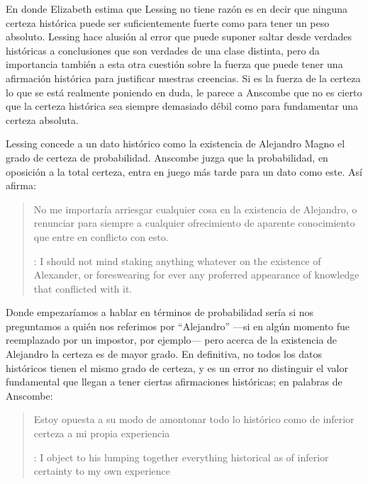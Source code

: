 En donde Elizabeth estima que Lessing no tiene razón es en decir que ninguna
certeza histórica puede ser suficientemente fuerte como para tener un peso
absoluto. Lessing hace alusión al error que puede suponer saltar desde verdades
históricas a conclusiones que son verdades de una clase distinta, pero da
importancia también a esta otra cuestión sobre la fuerza que puede tener una
afirmación histórica para justificar nuestras creencias. Si es la fuerza de la
certeza lo que se está realmente poniendo en duda, le parece a Anscombe que no
es cierto que la certeza histórica sea siempre demasiado débil como para
fundamentar una certeza absoluta.

Lessing concede a un dato histórico como la existencia de Alejandro Magno el
grado de certeza de probabilidad. Anscombe juzga que la probabilidad, en
oposición a la total certeza, entra en juego más tarde para un dato como este.
Así afirma: \blockquote[{\cite[26]{anscombe2008faith:prophandmi}}: I should not
mind staking anything whatever on the existence of Alexander, or foreswearing
for ever any proferred appearance of knowledge that conflicted with it.]{No me
  importaría arriesgar cualquier cosa en la existencia de Alejandro, o renunciar
  para siempre a cualquier ofrecimiento de aparente conocimiento que entre en
  conflicto con esto.} Donde empezaríamos a hablar en términos de probabilidad
sería si nos preguntamos a quién nos referimos por \enquote{Alejandro} ---si en
algún momento fue reemplazado por un impostor, por ejemplo--- pero acerca de la
existencia de Alejandro la certeza es de mayor grado. En definitiva, no todos
los datos históricos tienen el mismo grado de certeza, y es un error no
distinguir el valor fundamental que llegan a tener ciertas afirmaciones
históricas; en palabras de Anscombe:
\blockquote[{\cite[27]{anscombe2008faith:prophandmi}}: I object to his lumping
together everything historical as of inferior certainty to my own
experience]{Estoy opuesta a su modo de amontonar todo lo histórico como de
  inferior certeza a mi propia experiencia}.

